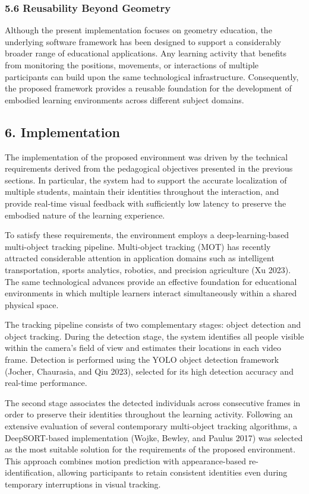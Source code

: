 \subsubsection{5.6 Reusability Beyond
Geometry}\label{reusability-beyond-geometry}

Although the present implementation focuses on geometry education, the
underlying software framework has been designed to support a
considerably broader range of educational applications. Any learning
activity that benefits from monitoring the positions, movements, or
interactions of multiple participants can build upon the same
technological infrastructure. Consequently, the proposed framework
provides a reusable foundation for the development of embodied learning
environments across different subject domains.

\subsection{6. Implementation}\label{implementation}

The implementation of the proposed environment was driven by the
technical requirements derived from the pedagogical objectives presented
in the previous sections. In particular, the system had to support the
accurate localization of multiple students, maintain their identities
throughout the interaction, and provide real-time visual feedback with
sufficiently low latency to preserve the embodied nature of the learning
experience.

To satisfy these requirements, the environment employs a
deep-learning-based multi-object tracking pipeline. Multi-object
tracking (MOT) has recently attracted considerable attention in
application domains such as intelligent transportation, sports
analytics, robotics, and precision agriculture (Xu 2023). The same
technological advances provide an effective foundation for educational
environments in which multiple learners interact simultaneously within a
shared physical space.

The tracking pipeline consists of two complementary stages: object
detection and object tracking. During the detection stage, the system
identifies all people visible within the camera's field of view and
estimates their locations in each video frame. Detection is performed
using the YOLO object detection framework (Jocher, Chaurasia, and Qiu
2023), selected for its high detection accuracy and real-time
performance.

The second stage associates the detected individuals across consecutive
frames in order to preserve their identities throughout the learning
activity. Following an extensive evaluation of several contemporary
multi-object tracking algorithms, a DeepSORT-based implementation
(Wojke, Bewley, and Paulus 2017) was selected as the most suitable
solution for the requirements of the proposed environment. This approach
combines motion prediction with appearance-based re-identification,
allowing participants to retain consistent identities even during
temporary interruptions in visual tracking.

